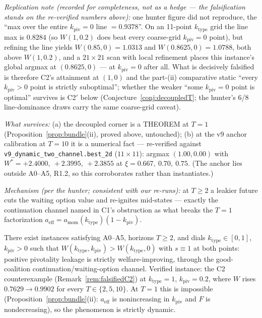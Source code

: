 \begin{remark}
\emph{Replication note (recorded for completeness, not as a hedge --- the falsification stands
on the re-verified numbers above):} one hunter figure did not reproduce, the ``max over the
entire $k_{\mathrm{piv}}=0$ line $=0.9378$''. On an 11-point $k_{\mathrm{type}}$ grid the line
max is $0.8284$ (so $W(1,0.2)$ does beat every coarse-grid $k_{\mathrm{piv}}=0$ point), but
refining the line yields $W(0.85,0)=1.0313$ and $W(0.8625,0)=1.0788$, both above $W(1,0.2)$,
and a $21\times 21$ scan with local refinement places this instance's global argmax at
$(0.8625,0)$ --- at $k_{\mathrm{piv}}=0$ after all. What is decisively falsified is therefore
C2's attainment at $(1,0)$ and the part-(ii) comparative static ``every $k_{\mathrm{piv}}>0$
point is strictly suboptimal''; whether the weaker ``some $k_{\mathrm{piv}}=0$ point is
optimal'' survives is C2$'$ below (Conjecture~\ref{conj:decoupledT}; the hunter's 6/8
line-dominance draws carry the same coarse-grid caveat).

\emph{What survives:} (a) the decoupled corner is a THEOREM at $T=1$
(Proposition~\ref{prop:bundle}(ii), proved above, untouched); (b) at the v9 anchor calibration
at $T=10$ it is a numerical fact --- re-verified against
\texttt{v9\_dynamic\_two\_channel.best\_2d} ($11\times 11$): argmax $(1.00,0.00)$ with
$W^*=+2.4000,\ +2.3995,\ +2.3855$ at $\xi=0.667,\ 0.70,\ 0.75$. (The anchor lies outside
A0--A5, R1.2, so this corroborates rather than instantiates.)

\emph{Mechanism (per the hunter; consistent with our re-runs):} at $T\ge 2$ a leakier future
cuts the waiting option value and re-ignites mid-states --- exactly the continuation channel
named in C1's obstruction as what breaks the $T=1$ factorization
$a_{\mathrm{eff}}=a_{\mathrm{mom}}(k_{\mathrm{type}})(1-k_{\mathrm{piv}})$.
\end{remark}

\begin{restatedobservation}
There exist instances satisfying A0--A5, horizons $T\ge 2$, and dials
$k_{\mathrm{type}}\in[0,1]$, $k_{\mathrm{piv}}>0$ such that
$W(k_{\mathrm{type}},k_{\mathrm{piv}})>W(k_{\mathrm{type}},0)$ with $s\equiv 1$ at both
points: positive pivotality leakage is strictly welfare-improving, through the good-coalition
continuation/waiting-option channel. Verified instance: the C2 counterexample
(Remark~\ref{rem:falsifiedC2}) at $k_{\mathrm{type}}=1$, $k_{\mathrm{piv}}=0.2$, where $W$
rises $0.7629\to 0.9902$ for every $T\in\{2,5,10\}$. At $T=1$ this is impossible
(Proposition~\ref{prop:bundle}(ii): $a_{\mathrm{eff}}$ is nonincreasing in $k_{\mathrm{piv}}$
and $F$ is nondecreasing), so the phenomenon is strictly dynamic.
\end{restatedobservation}


